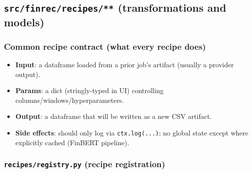 \documentclass[11pt]{article}
\begin{document}
\subsection{\texttt{src/finrec/recipes/**} (transformations and models)}


\subsubsection{Common recipe contract (what every recipe does)}

\begin{itemize}[leftmargin=*,nosep]
\item \textbf{Input}: a dataframe loaded from a prior job’s artifact (usually a provider output).
\item \textbf{Params}: a dict (stringly-typed in UI) controlling columns/windows/hyperparameters.
\item \textbf{Output}: a dataframe that will be written as a new CSV artifact.
\item \textbf{Side effects}: should only log via \texttt{ctx.log(...)}; no global state except where explicitly cached (FinBERT pipeline).
\end{itemize}


\subsubsection{\texttt{recipes/registry.py} (recipe registration)}
\end{document}
